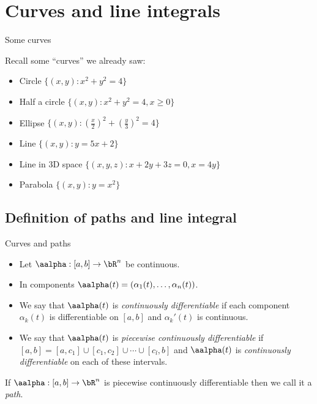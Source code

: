 \chapter{Curves and line integrals}


    {Some curves}

    Recall some ``curves'' we already saw:

    \begin{itemize}
        \item Circle \(\{(x,y):x^2+y^2 = 4\}\)
        \item Half a circle \(\{(x,y): x^2+y^2 = 4, x\geq 0\}\)
        \item Ellipse \(\{(x,y): (\frac{x}{2})^2 + (\frac{y}{3})^2 = 4\}\)
        \item Line \(\{(x,y):y=5x+2\}\)
        \item Line in 3D space \(\{(x,y,z):x+2y+3z=0, x=4y\}\)
        \item Parabola \(\{(x,y):y=x^2\}\)
    \end{itemize}






\section{Definition of paths and line integral}


    {Curves and paths}

    \begin{itemize}
        \item Let \(\aalpha : [a,b] \to \bR^n\) be continuous.
        \item  In components \(\aalpha(t) = (\alpha_1(t),\ldots,\alpha_n(t))\).
        \item  We say that \(\aalpha(t)\) is \emph{continuously differentiable} if each component \(\alpha_k(t)\) is differentiable on \([a,b]\) and \(\alpha_k'(t)\) is continuous.
        \item We say that \(\aalpha(t)\) is \emph{piecewise continuously differentiable} if \([a,b] = [a,c_1]\cup[c_1,c_2] \cup \cdots \cup [c_l,b]\) and \(\aalpha(t)\) is \emph{continuously differentiable} on each of these intervals.
    \end{itemize}

    
        \begin{definition}
            If \(\aalpha: [a,b] \to \bR^n\) is piecewise continuously differentiable then we call it a \emph{path}.
        \end{definition}
    




